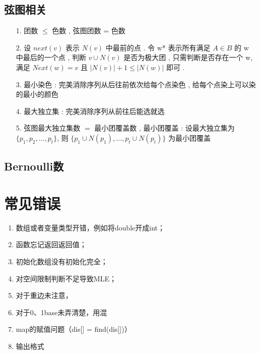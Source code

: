 \documentclass[landscape,twocolumn,a4paper]{article}
\begin{document}
\subsection{弦图相关}
\begin{enumerate}
	\item[1.] 团数 $\leq$ 色数 , 弦图团数 = 色数
	\item[2.] 设 $next(v)$ 表示 $N(v)$ 中最前的点 . 
	令 w* 表示所有满足 $A \in B$ 的 w 中最后的一个点 , 
	判断 $v \cup N(v)$ 是否为极大团 , 
	只需判断是否存在一个 w, 
	满足 $Next(w)=v$ 且 $|N(v)| + 1 \leq |N(w)|$ 即可 . 
	\item[3.] 最小染色 : 完美消除序列从后往前依次给每个点染色 , 
	给每个点染上可以染的最小的颜色
	\item[4.] 最大独立集 : 完美消除序列从前往后能选就选
	\item[5.] 弦图最大独立集数 $=$ 最小团覆盖数 , 
	最小团覆盖 : 
	设最大独立集为 $\{p_1,p_2, \dots ,p_t\}$, 
	则 $\{p_1\cup N(p_1), \dots , p_t \cup N(p_t)\}$ 
	为最小团覆盖
\end{enumerate}
\fi

\subsection{Bernoulli数}

\iffalse
\section{常见错误}

\begin{spacing}{0.6}
	\begin{enumerate}
		\item 数组或者变量类型开错，例如将double开成int；
		\item 函数忘记返回返回值；
		\item 初始化数组没有初始化完全；
		\item 对空间限制判断不足导致MLE；
		\item 对于重边未注意，
		\item 对于0、1base未弄清楚，用混
		\item map的赋值问题（dis[] = find(dis[])）
		\item 输出格式
	\end{enumerate}
\end{spacing}
\end{document}
